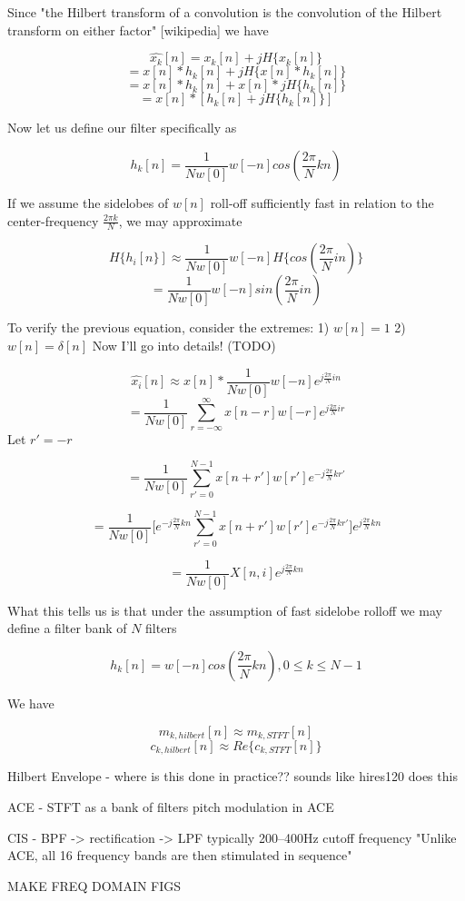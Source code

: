 \documentclass [11pt, proquest] {uwthesis}[2015/03/03]
\begin{document}
Since "the Hilbert transform of a convolution is the convolution of the Hilbert transform on either factor" [wikipedia] we have 

$$\widehat{x_k}[n] = x_k[n] + jH\{x_k[n]\}$$
$$= x[n] * h_k[n] + jH\{x[n] * h_k[n]\}$$
$$= x[n] * h_k[n] + x[n] * jH\{h_k[n]\}$$
$$= x[n] * [h_k[n]+  jH\{h_k[n]\}]$$

Now let us define our filter specifically as

$$h_k[n] = \frac{1}{Nw[0]}w[-n]cos(\frac{2\pi}{N}kn)$$

If we assume the sidelobes of $w[n]$ roll-off sufficiently fast in relation to the center-frequency $\frac{2\pi k}{N}$, we may approximate

$$H\{h_i[n\}] \approx \frac{1}{Nw[0]}w[-n] H\{cos(\frac{2\pi}{N}in)\}$$
$$= \frac{1}{Nw[0]}w[-n]sin(\frac{2\pi}{N}in)$$

To verify the previous equation, consider the extremes:
1) $w[n] = 1$
2) $w[n] = \delta[n]$
Now I'll go into details! (TODO)

$$\widehat{x_i}[n] \approx x[n] * \frac{1}{Nw[0]}w[-n]e^{j\frac{2\pi}{N}in}$$
$$ =\frac{1}{Nw[0]}\sum\limits_{r=-\infty}^{\infty}x[n - r] w[-r] e^{j\frac{2\pi}{N}ir}$$
Let $r' = -r$

$$= \frac{1}{Nw[0]}\sum\limits_{r'=0}^{N-1} x[n + r'] w[r'] e^{-j\frac{2\pi}{N}kr'}$$


$$= \frac{1}{Nw[0]}\bigg[e^{-j\frac{2\pi}{N}kn} \sum\limits_{r'=0}^{N-1} x[n + r'] w[r'] e^{-j\frac{2\pi}{N}kr'}\bigg]e^{j\frac{2\pi}{N}kn}$$

$$ = \frac{1}{Nw[0]}X[n,i]e^{j\frac{2\pi}{N}kn}$$



What this tells us is that under the assumption of fast sidelobe rolloff we may define a filter bank of $N$ filters

$$h_k[n] = w[-n]cos(\frac{2\pi}{N}kn), 0 \leq k \leq N-1$$

We have

$$m_{k,hilbert}[n] \approx m_{k,STFT}[n]$$
$$c_{k,hilbert}[n] \approx Re\{c_{k,STFT}[n]\}$$

Hilbert Envelope - where is this done in practice??
	sounds like hires120 does this

ACE - STFT as a bank of filters
pitch modulation in ACE


CIS - BPF -> rectification -> LPF   
	typically 200–400Hz cutoff frequency
	"Unlike ACE, all 16 frequency bands are then stimulated in sequence"


MAKE FREQ DOMAIN FIGS
\end{document}
